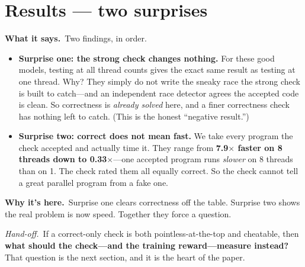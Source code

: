 \documentclass[11pt]{article}
\newcommand{\handoff}[1]{\textit{Hand-off.}\ #1}
\newcommand{\says}[1]{\textbf{What it says.}\ #1}
\newcommand{\why}[1]{\textbf{Why it's here.}\ #1}
\begin{document}
\section{Results --- two surprises}
\says{Two findings, in order.}
\begin{itemize}
\item \textbf{Surprise one: the strong check changes nothing.} For these good models,
  testing at all thread counts gives the exact same result as testing at one thread. Why?
  They simply do not write the sneaky race the strong check is built to catch---and an
  independent race detector agrees the accepted code is clean. So correctness is
  \emph{already solved} here, and a finer correctness check has nothing left to catch.
  (This is the honest ``negative result.'')
\item \textbf{Surprise two: correct does not mean fast.} We take every program the check
  accepted and actually time it. They range from \textbf{7.9$\times$ faster on 8 threads
  down to 0.33$\times$}---one accepted program runs \emph{slower} on 8 threads than on 1.
  The check rated them all equally correct. So the check cannot tell a great parallel
  program from a fake one.
\end{itemize}

\why{Surprise one clears correctness off the table. Surprise two shows the real problem is
now speed. Together they force a question.}

\handoff{If a correct-only check is both pointless-at-the-top and cheatable, then
\textbf{what should the check---and the training reward---measure instead?} That question
is the next section, and it is the heart of the paper.}
\end{document}
